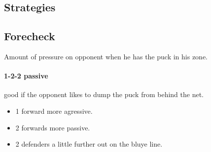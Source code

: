 \documentclass[10pt, french]{article}
\begin{document}
\begin{multicols*}{2}
\section*{Strategies}

\subsection*{Forecheck} Amount of pressure on opponent when he has the puck in his zone.

\paragraph{1-2-2 passive} good if the opponent likes to dump the puck from behind the net.

\begin{minipage}{0.4\columnwidth}
\begin{itemize}[leftmargin = *]
	\item	1 forward more agressive.
	\item	2 forwards more passive.
	\item	2 defenders a little further out on the bluye line.
\end{itemize}
\end{minipage}
\begin{minipage}{0.6\columnwidth}

\begin{tikzpicture}[x=0.75pt,y=0.75pt,yscale=-1,xscale=1]


\end{tikzpicture}
\end{minipage}
\end{multicols*}
\end{document}
